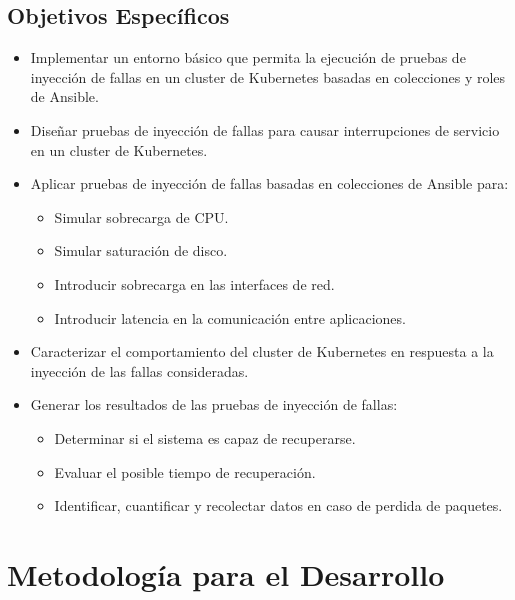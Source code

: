 \subsection{Objetivos Específicos}
\begin{itemize}    
    \item Implementar un entorno básico que permita la ejecución de pruebas de inyección de fallas en un cluster de Kubernetes basadas en colecciones y roles de Ansible.
    \item Diseñar pruebas de inyección de fallas para causar interrupciones de servicio en un cluster de Kubernetes.
    \item Aplicar pruebas de inyección de fallas basadas en colecciones de Ansible para:
    \begin{itemize}
        \item Simular sobrecarga de CPU.
        \item Simular saturación de disco. 
        \item Introducir sobrecarga en las interfaces de red.
        \item Introducir latencia en la comunicación entre aplicaciones.
    \end{itemize}
    \item Caracterizar el comportamiento del cluster de Kubernetes en respuesta a la inyección de las fallas consideradas.
    \item Generar los resultados de las pruebas de inyección de fallas:
    \begin{itemize}
        \item Determinar si el sistema es capaz de recuperarse.
        \item Evaluar el posible tiempo de recuperación.
        \item Identificar, cuantificar y recolectar datos en caso de perdida de paquetes.
    \end{itemize}
\end{itemize}
\section{Metodología para el Desarrollo}


